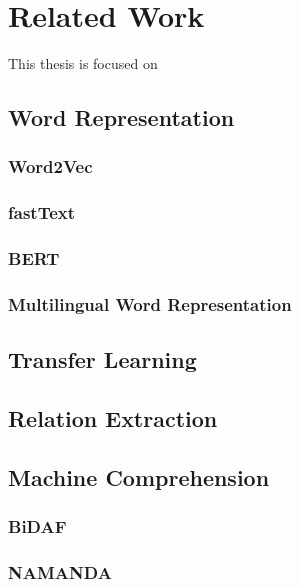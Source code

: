 \chapter{Related Work}
This thesis is focused on 

\section{Word Representation}
\subsection{Word2Vec}
\subsection{fastText}
\subsection{BERT}

\subsection{Multilingual Word Representation}


\section{Transfer Learning}

\section{Relation Extraction}

\section{Machine Comprehension}
\subsection{BiDAF}
\subsection{NAMANDA}

